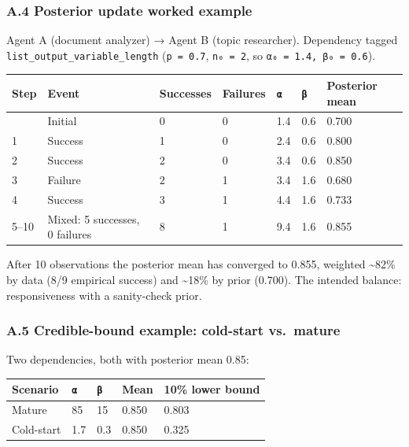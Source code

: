 \documentclass[
  11pt,
]{article}
\newcounter{none} %
\begin{document}
\subsubsection{A.4 Posterior update worked
example}\label{a.4-posterior-update-worked-example}

Agent A (document analyzer) → Agent B (topic researcher). Dependency
tagged \texttt{list\_output\_variable\_length} (\texttt{p\ =\ 0.7},
\texttt{n₀\ =\ 2}, so \texttt{α₀\ =\ 1.4,\ β₀\ =\ 0.6}).

{\def\LTcaptype{none} %
\begin{longtable}[]{@{}lllllll@{}}
\toprule\noalign{}
Step & Event & Successes & Failures & \texttt{α} & \texttt{β} &
Posterior mean \\
\midrule\noalign{}
\endhead
\bottomrule\noalign{}
\endlastfoot
0 & Initial & 0 & 0 & 1.4 & 0.6 & 0.700 \\
1 & Success & 1 & 0 & 2.4 & 0.6 & 0.800 \\
2 & Success & 2 & 0 & 3.4 & 0.6 & 0.850 \\
3 & Failure & 2 & 1 & 3.4 & 1.6 & 0.680 \\
4 & Success & 3 & 1 & 4.4 & 1.6 & 0.733 \\
5--10 & Mixed: 5 successes, 0 failures & 8 & 1 & 9.4 & 1.6 & 0.855 \\
\end{longtable}
}

After 10 observations the posterior mean has converged to 0.855,
weighted \textasciitilde82\% by data (8/9 empirical success) and
\textasciitilde18\% by prior (0.700). The intended balance:
responsiveness with a sanity-check prior.

\subsubsection{A.5 Credible-bound example: cold-start
vs.~mature}\label{a.5-credible-bound-example-cold-start-vs.-mature}

Two dependencies, both with posterior mean 0.85:

{\def\LTcaptype{none} %
\begin{longtable}[]{@{}lllll@{}}
\toprule\noalign{}
Scenario & \texttt{α} & \texttt{β} & Mean & 10\% lower bound \\
\midrule\noalign{}
\endhead
\bottomrule\noalign{}
\endlastfoot
Mature & 85 & 15 & 0.850 & 0.803 \\
Cold-start & 1.7 & 0.3 & 0.850 & 0.325 \\
\end{longtable}
}
\end{document}

